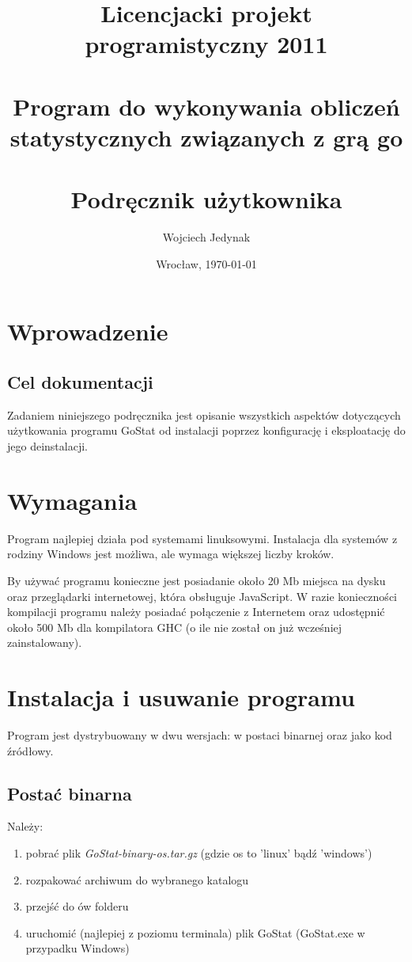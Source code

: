 \documentclass[10pt,leqno]{article}
\title{\LARGE Licencjacki projekt programistyczny 2011 \\ 
       \ \\
       Program do wykonywania obliczeń statystycznych związanych z grą go \\ 
       \ \\
       Podręcznik użytkownika }
\author{Wojciech Jedynak}
\date{Wrocław, \today}
\begin{document}
\maketitle 

\thispagestyle{empty}
\tableofcontents

\newpage

\section{Wprowadzenie}

\subsection{Cel dokumentacji}
Zadaniem niniejszego podręcznika jest opisanie wszystkich aspektów dotyczących użytkowania programu GoStat od instalacji poprzez konfigurację
i eksploatację do jego deinstalacji.

\section{Wymagania}
Program najlepiej działa pod systemami linuksowymi. Instalacja dla systemów z rodziny Windows jest możliwa, ale wymaga większej liczby kroków. 

By używać programu konieczne jest posiadanie około 20 Mb miejsca na dysku oraz przeglądarki internetowej, która obsługuje JavaScript. 
W razie konieczności kompilacji programu należy posiadać połączenie z Internetem oraz udostępnić około 500 Mb dla kompilatora GHC (o ile nie 
został on już wcześniej zainstalowany).

\newpage

\section{Instalacja i usuwanie programu}
Program jest dystrybuowany w dwu wersjach: w postaci binarnej oraz jako kod źródłowy.

\subsection{Postać binarna}
Należy: 
\begin{enumerate}
\item pobrać plik \emph{GoStat-binary-os.tar.gz} (gdzie os to 'linux' bądź 'windows')
\item rozpakować archiwum do wybranego katalogu
\item przejść do ów folderu
\item uruchomić (najlepiej z poziomu terminala) plik GoStat (GoStat.exe w przypadku Windows)
\end{enumerate}
\end{document}
